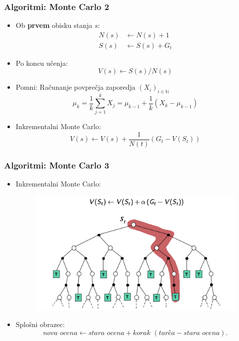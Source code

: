 \documentclass{beamer}    %
\begin{document}
\begin{frame}
    \frametitle{Algoritmi: Monte Carlo 2}
    \begin{itemize}
        \item Ob \textbf{prvem} obisku stanja $s$: 
        \begin{align*}
            N(s) &\leftarrow N(s) + 1 \\
            S(s) &\leftarrow S(s) + G_t
        \end{align*}
        \item Po koncu učenja: 
        $$
        V(s) \leftarrow S(s) / N(s)
        $$
       \item Pomni: Računanje povprečja zaporedja $(X_i)_{i \in \mathbb{N}}$
       $$
       \mu_k = \frac{1}{k} \sum_{j=1}^k X_j = \mu_{k-1} + \frac{1}{k} (X_k - \mu_{k-1})
       $$
       \item Inkrementalni Monte Carlo:
       $$
       V(s) \leftarrow V(s) + \frac{1}{N(t)} (G_t - V(S_t))
       $$
    \end{itemize}
\end{frame}


\begin{frame}
    \frametitle{Algoritmi: Monte Carlo 3}
    \begin{itemize}
        \item Inkrementalni Monte Carlo:
                \begin{figure}[b]
                    \includegraphics[scale=0.45]{slike/backup-mc.png}
                \end{figure}
        \item Splošni obrazec: 
                $$
                \textit{nova ocena} \leftarrow \textit{stara ocena} + \textit{korak } 
                (\textit{tarča} - \textit{stara ocena}).
                $$
    \end{itemize}
\end{frame}
\end{document}
